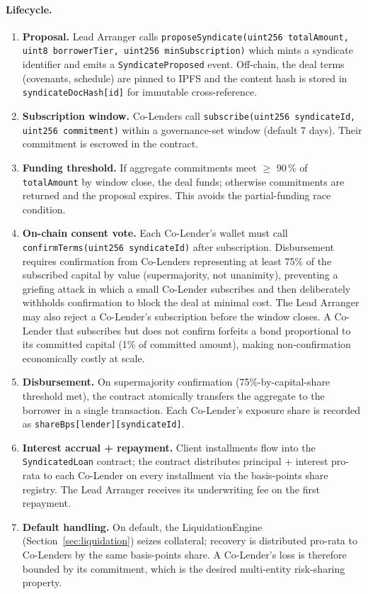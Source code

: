 \documentclass[12pt,a4paper]{report}
\begin{document}
\paragraph{Lifecycle.}

\begin{enumerate}[noitemsep]
\item \textbf{Proposal.} Lead Arranger calls \texttt{proposeSyndicate(uint256 totalAmount, uint8 borrowerTier, uint256 minSubscription)} which mints a syndicate identifier and emits a \texttt{SyndicateProposed} event. Off-chain, the deal terms (covenants, schedule) are pinned to IPFS and the content hash is stored in \texttt{syndicateDocHash[id]} for immutable cross-reference.
\item \textbf{Subscription window.} Co-Lenders call \texttt{subscribe(uint256 syndicateId, uint256 commitment)} within a governance-set window (default 7 days). Their commitment is escrowed in the contract.
\item \textbf{Funding threshold.} If aggregate commitments meet $\ge$ 90\,\% of \texttt{totalAmount} by window close, the deal funds; otherwise commitments are returned and the proposal expires. This avoids the partial-funding race condition.
\item \textbf{On-chain consent vote.} Each Co-Lender's wallet must call \texttt{confirmTerms(uint256 syndicateId)} after subscription. Disbursement requires confirmation from Co-Lenders representing at least 75\% of the subscribed capital by value (supermajority, not unanimity), preventing a griefing attack in which a small Co-Lender subscribes and then deliberately withholds confirmation to block the deal at minimal cost. The Lead Arranger may also reject a Co-Lender's subscription before the window closes. A Co-Lender that subscribes but does not confirm forfeits a bond proportional to its committed capital (1\% of committed amount), making non-confirmation economically costly at scale.
\item \textbf{Disbursement.} On supermajority confirmation (75\%-by-capital-share threshold met), the contract atomically transfers the aggregate to the borrower in a single transaction. Each Co-Lender's exposure share is recorded as \texttt{shareBps[lender][syndicateId]}.
\item \textbf{Interest accrual + repayment.} Client installments flow into the \texttt{SyndicatedLoan} contract; the contract distributes principal + interest pro-rata to each Co-Lender on every installment via the basis-points share registry. The Lead Arranger receives its underwriting fee on the first repayment.
\item \textbf{Default handling.} On default, the LiquidationEngine (Section~\ref{sec:liquidation}) seizes collateral; recovery is distributed pro-rata to Co-Lenders by the same basis-points share. A Co-Lender's loss is therefore bounded by its commitment, which is the desired multi-entity risk-sharing property.
\end{enumerate}
\end{document}
